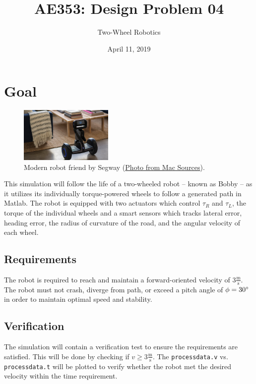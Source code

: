 \documentclass[12pt]{article}
\title{AE353: Design Problem 04}
\author{Two-Wheel Robotics}
\date{April 11, 2019}
\begin{document}
\maketitle

\section{Goal} \label{sec:1}
\begin{figure}
\vspace{-6em}%
\includegraphics[width=0.4\textwidth]{segwayrobotics.jpg}
\vspace{-1em}
\caption{Modern robot friend by Segway (\href{https://macsources.com/segway-robotics-defines-the-future-of-mobile-robots-with-loomo-news/}{Photo from Mac Sources}). \label{figure:1}}
\end{figure}

This simulation will follow the life of a two-wheeled robot -- known as Bobby -- as it utilizes its individually torque-powered wheels to follow a generated path in Matlab.  The robot is equipped with two actuators which control $\tau_R$ and $\tau_L$, the torque of the individual wheels and a smart sensors which tracks lateral error, heading error, the radius of curvature of the road, and the angular velocity of each wheel.

\subsection{Requirements} \label{sec:1.1}
The robot is required to reach and maintain a forward-oriented velocity of $3 \frac{\mbox{m}}{\mbox{s}}$.  The robot must not crash, diverge from path, or exceed a pitch angle of $\phi = 30\degree$ in order to maintain optimal speed and stability.

\subsection{Verification} \label{sec:1.2}
The simulation will contain a verification test to ensure the requirements are satisfied.  This will be done by checking if $v \geq 3 \frac{\mbox{m}}{\mbox{s}}$.  The \lstinline{processdata.v} vs. \lstinline{processdata.t} will be plotted to verify whether the robot met the desired velocity within the time requirement.
\end{document}
